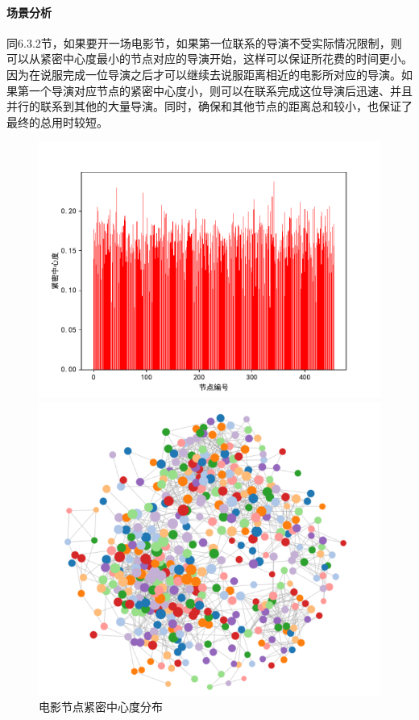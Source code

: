 \documentclass[UTF8, onecolumn, a4paper]{article}
\begin{document}
    \paragraph{场景分析}同6.3.2节，如果要开一场电影节，如果第一位联系的导演不受实际情况限制，则可以从紧密中心度最小的节点对应的导演开始，这样可以保证所花费的时间更小。因为在说服完成一位导演之后才可以继续去说服距离相近的电影所对应的导演。如果第一个导演对应节点的紧密中心度小，则可以在联系完成这位导演后迅速、并且并行的联系到其他的大量导演。同时，确保和其他节点的距离总和较小，也保证了最终的总用时较短。
\begin{center}
	\begin{figure}[ht] %
		\centering %
		\begin{minipage}[b]{0.95\linewidth} %
			\begin{minipage}[b]{0.47\linewidth} %
				\centering
				\includegraphics[width=\linewidth]{../pictures/movie_closeness}
				\caption{电影节点紧密中心度分布}
			\end{minipage}
			\hfill
			\begin{minipage}[b]{0.46\linewidth}
				\centering
				\includegraphics[width=\linewidth]{../pictures/show12}

\end{minipage}
\end{minipage}
\end{figure}
\end{center}
\end{document}
